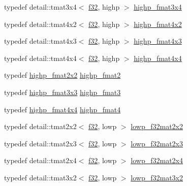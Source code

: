 \begin{CompactItemize}
\item 
typedef detail::tmat3x4$<$ \hyperlink{group__gtc__type__precision_g0ec999b57f5330d9021256e96038df04}{f32}, highp $>$ \hyperlink{group__gtc__type__precision_g1f377a3da21dd6c418ec3a5119a4514a}{highp\_\-fmat3x4}
\item 
typedef detail::tmat4x2$<$ \hyperlink{group__gtc__type__precision_g0ec999b57f5330d9021256e96038df04}{f32}, highp $>$ \hyperlink{group__gtc__type__precision_gb3d688f05a884be93c647bce2d8a46f4}{highp\_\-fmat4x2}
\item 
typedef detail::tmat4x3$<$ \hyperlink{group__gtc__type__precision_g0ec999b57f5330d9021256e96038df04}{f32}, highp $>$ \hyperlink{group__gtc__type__precision_g07f7578fc5a4dd8cdd8a532db25d535f}{highp\_\-fmat4x3}
\item 
typedef detail::tmat4x4$<$ \hyperlink{group__gtc__type__precision_g0ec999b57f5330d9021256e96038df04}{f32}, highp $>$ \hyperlink{group__gtc__type__precision_gf0a98d6caffce89da963d3430e05ddb0}{highp\_\-fmat4x4}
\item 
typedef \hyperlink{group__gtc__type__precision_geb76f1230ecfd4c80635d3c618405e31}{highp\_\-fmat2x2} \hyperlink{group__gtc__type__precision_g10d47be18a81c111a8706d0a6df5b4ea}{highp\_\-fmat2}
\item 
typedef \hyperlink{group__gtc__type__precision_gf1d697243b1de74a5769c49e68b1e2a6}{highp\_\-fmat3x3} \hyperlink{group__gtc__type__precision_g3ff9af2eba26aa6df92aa73e1083e81e}{highp\_\-fmat3}
\item 
typedef \hyperlink{group__gtc__type__precision_gf0a98d6caffce89da963d3430e05ddb0}{highp\_\-fmat4x4} \hyperlink{group__gtc__type__precision_g4c7c9823ade7c29e29b5a313949ae502}{highp\_\-fmat4}
\item 
typedef detail::tmat2x2$<$ \hyperlink{group__gtc__type__precision_g0ec999b57f5330d9021256e96038df04}{f32}, lowp $>$ \hyperlink{group__gtc__type__precision_ge5beaa9212ba199167c7c7088a70b2bd}{lowp\_\-f32mat2x2}
\item 
typedef detail::tmat2x3$<$ \hyperlink{group__gtc__type__precision_g0ec999b57f5330d9021256e96038df04}{f32}, lowp $>$ \hyperlink{group__gtc__type__precision_g7e45acb54ae2e4f5113a05b08eea5812}{lowp\_\-f32mat2x3}
\item 
typedef detail::tmat2x4$<$ \hyperlink{group__gtc__type__precision_g0ec999b57f5330d9021256e96038df04}{f32}, lowp $>$ \hyperlink{group__gtc__type__precision_ge0da8e4239df703d44875b49a900c893}{lowp\_\-f32mat2x4}
\item 
typedef detail::tmat3x2$<$ \hyperlink{group__gtc__type__precision_g0ec999b57f5330d9021256e96038df04}{f32}, lowp $>$ \hyperlink{group__gtc__type__precision_gdf8ee4630e8d2b6ae72293a7c8dff497}{lowp\_\-f32mat3x2}

\end{CompactItemize}
